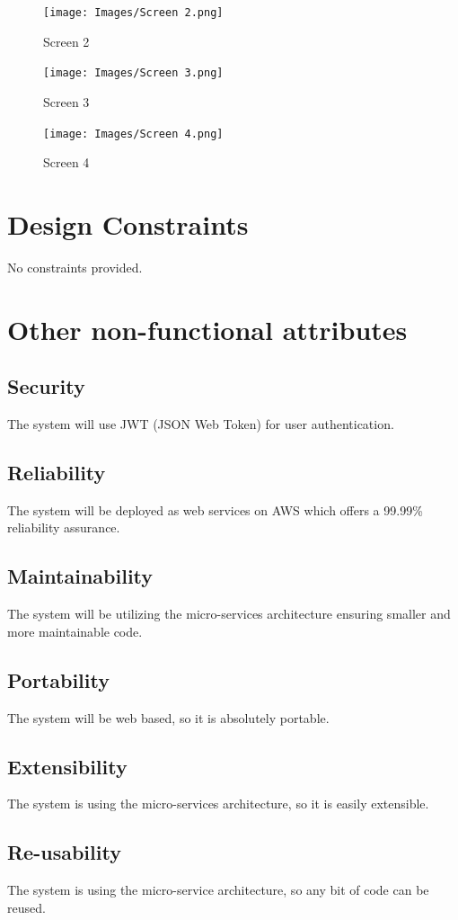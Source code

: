 \documentclass[12pt]{article}
\begin{document}
\begin{figure}[H]
    \texttt{[image: Images/Screen 2.png]}
    \caption{Screen 2}
\end{figure}

\begin{figure}[H]
    \texttt{[image: Images/Screen 3.png]}
    \caption{Screen 3}
\end{figure}
\begin{figure}[H]
    \texttt{[image: Images/Screen 4.png]}
    \caption{Screen 4}
\end{figure}

\section{Design Constraints}
No constraints provided.

\section{Other non-functional attributes}
\subsection {Security}
The system will use JWT (JSON Web Token) for user authentication.
\subsection {Reliability}
The system will be deployed as web services on AWS which offers a 99.99\% reliability assurance.
\subsection {Maintainability}
The system will be utilizing the micro-services architecture ensuring smaller and more maintainable code.
\subsection {Portability}
The system will be web based, so it is absolutely portable.
\subsection {Extensibility}
The system is using the micro-services architecture, so it is easily extensible.
\subsection {Re-usability}
The system is using the micro-service architecture, so any bit of code can be reused.
\end{document}

